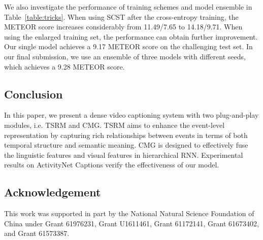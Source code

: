 \documentclass[10pt,twocolumn,letterpaper]{article}
\begin{document}
We also investigate the performance of training schemes and model ensemble in Table~\ref{table:tricks}. When using SCST after the cross-entropy training, the METEOR score increases considerably from 11.49/7.65 to 14.18/9.71. When using the enlarged training set, the performance can obtain further improvement. Our single model achieves a 9.17 METEOR score on the challenging test set. In our final submission, we use an ensemble of three models with different seeds, which achieves a 9.28 METEOR score.

\subsection{Conclusion}

In this paper, we present a dense video captioning system with two plug-and-play modules, i.e. TSRM and CMG. TSRM aims to enhance the event-level representation by capturing rich relationships between events in terms of both temporal structure and semantic meaning. CMG is designed to effectively fuse the linguistic features and visual features in hierarchical RNN. Experimental results on ActivityNet Captions verify the effectiveness of our model.

\subsection{Acknowledgement}
This work was supported in part by the National Natural Science Foundation of China under Grant 61976231, Grant U1611461, Grant 61172141, Grant 61673402, and Grant 61573387.

{\small


}
\end{document}
